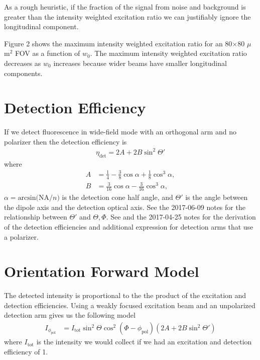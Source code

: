 \documentclass[11pt]{article}
\begin{document}
As a rough heuristic, if the fraction of the signal from noise and background is
greater than the intensity weighted excitation ratio we can justifiably ignore
the longitudinal component.

Figure 2 shows the maximum intensity weighted excitation ratio for an
80$\times$80 $\mu$m${}^2$ FOV as a function of $w_0$. The maximum intensity
weighted excitation ratio decreases as $w_0$ increases because wider beams
have smaller longitudinal components.


\section{Detection Efficiency}
If we detect fluorescence in wide-field mode with an orthogonal arm and no
polarizer then the detection efficiency is
\begin{align}
  \eta_{\text{det}} = 2A + 2B\sin^2\Theta'
\end{align}
where
\begin{align}
  A &= \frac{1}{4} - \frac{3}{8}\cos\alpha + \frac{1}{8}\cos^3\alpha,\\
  B &= \frac{3}{16}\cos\alpha - \frac{3}{16}\cos^3\alpha, 
\end{align}
$\alpha = \text{arcsin(NA}/n)$ is the detection cone half angle, and $\Theta'$
is the angle between the dipole axis and the detection optical axis. See the
2017-06-09 notes for the relationship between $\Theta'$ and $\Theta,\Phi$. See
\cite{fourkas} and the 2017-04-25 notes for the derivation of the detection
efficiencies and additional expression for detection arms that use a polarizer.

\section{Orientation Forward Model}
The detected intensity is proportional to the the product of the excitation and
detection efficiencies. Using a weakly focused excitation beam and an
unpolarized detection arm gives us the following model
\begin{align}
  I_{\phi_{\text{pol}}} &= I_{\text{tot}}\sin^2\Theta\cos^2(\Phi - \phi_{\text{pol}})(2A+2B\sin^2\Theta')\label{eq:forward}
\end{align}
where $I_{\text{tot}}$ is the intensity we would collect if we had an excitation and detection efficiency of 1.
\end{document}
